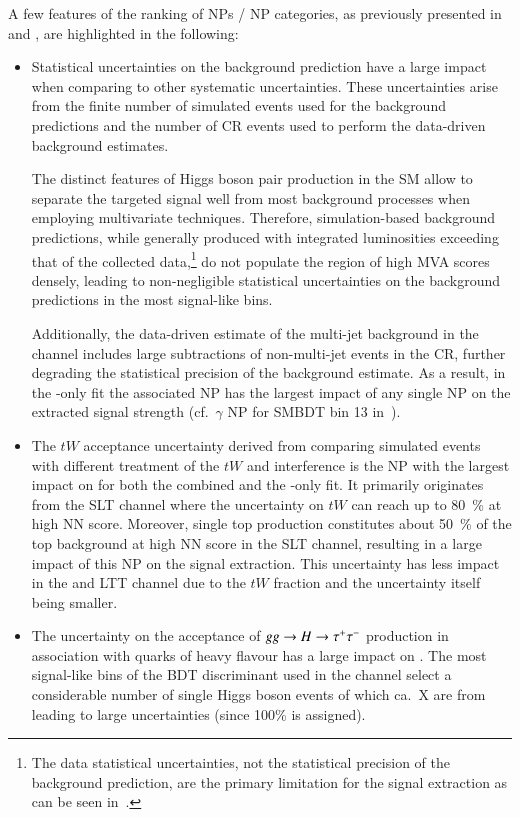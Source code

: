 A few features of the ranking of NPs / NP categories, as previously presented in
 and , are highlighted
in the following:
\begin{itemize}
\item Statistical uncertainties on the background prediction have a large impact
  when comparing to other systematic uncertainties. These uncertainties arise
  from the finite number of simulated events used for the background predictions
  and the number of CR events used to perform the data-driven \faketauhadvis
  background estimates.

  The distinct features of Higgs boson pair production in the SM allow to
  separate the targeted signal well from most background processes when
  employing multivariate techniques. Therefore, simulation-based background
  predictions, while generally produced with integrated luminosities exceeding
  that of the collected data,\footnote{The data statistical uncertainties, not
    the statistical precision of the background prediction, are the primary
    limitation for the signal extraction as can be seen
    in~.} do not populate the region of high MVA
  scores densely, leading to non-negligible statistical uncertainties on the
  background predictions in the most signal-like bins.

  Additionally, the data-driven estimate of the multi-jet background in the
  \hadhad channel includes large subtractions of non-multi-jet events in the CR,
  further degrading the statistical precision of the background estimate. As a
  result, in the \hadhad-only fit the associated NP has the largest impact of
  any single NP on the extracted signal strength (cf.\ $\gamma$ NP for SMBDT bin
  13 in~).

\item The $tW$ acceptance uncertainty derived from comparing simulated events
  with different treatment of the $tW$ and \ttbar interference is the NP with
  the largest impact on \muhat for both the combined and the \lephad-only
  fit. It primarily originates from the \lephad SLT channel where the
  uncertainty on $tW$ can reach up to \SI{80}{\percent} at high NN
  score. Moreover, single top production constitutes about \SI{50}{\percent} of
  the top background at high NN score in the \lephad SLT channel, resulting in a
  large impact of this NP on the signal extraction. This uncertainty has less
  impact in the \hadhad and \lephad LTT channel due to the $tW$ fraction and the
  uncertainty itself being smaller.

\item The uncertainty on the acceptance of $gg \to H \to \tau^{+} \tau^{-}$ production in
  association with quarks of heavy flavour has a large impact on \muhat. The
  most signal-like bins of the BDT discriminant used in the \hadhad channel
  select a considerable number of single Higgs boson events of which ca.\ X are
  from \ggF leading to large uncertainties (since 100\% is assigned).
\end{itemize}

